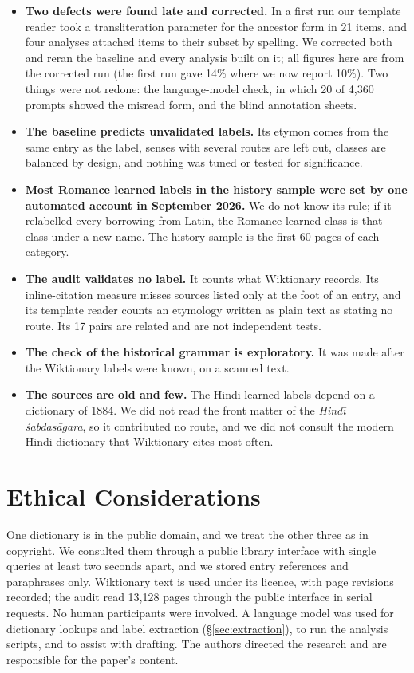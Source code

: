 \documentclass[11pt]{article}
\begin{document}
\begin{itemize}
\item \textbf{Two defects were found late and corrected.} In a first run our template reader took a transliteration parameter for the ancestor form in 21 items, and four analyses attached items to their subset by spelling. We corrected both and reran the baseline and every analysis built on it; all figures here are from the corrected run (the first run gave 14\% where we now report 10\%). Two things were not redone: the language-model check, in which 20 of 4,360 prompts showed the misread form, and the blind annotation sheets.
\item \textbf{The baseline predicts unvalidated labels.} Its etymon comes from the same entry as the label, senses with several routes are left out, classes are balanced by design, and nothing was tuned or tested for significance.
\item \textbf{Most Romance learned labels in the history sample were set by one automated account in September 2026.} We do not know its rule; if it relabelled every borrowing from Latin, the Romance learned class is that class under a new name. The history sample is the first 60 pages of each category.
\item \textbf{The audit validates no label.} It counts what Wiktionary records. Its inline-citation measure misses sources listed only at the foot of an entry, and its template reader counts an etymology written as plain text as stating no route. Its 17 pairs are related and are not independent tests.
\item \textbf{The check of the historical grammar is exploratory.} It was made after the Wiktionary labels were known, on a scanned text.
\item \textbf{The sources are old and few.} The Hindi learned labels depend on a dictionary of 1884. We did not read the front matter of the \textit{Hind\=\i{} \'sabdas\=agara}, so it contributed no route, and we did not consult the modern Hindi dictionary that Wiktionary cites most often.
\end{itemize}

\section*{Ethical Considerations}

One dictionary is in the public domain, and we treat the other three as in copyright. We consulted them through a public library interface with single queries at least two seconds apart, and we stored entry references and paraphrases only. Wiktionary text is used under its licence, with page revisions recorded; the audit read 13,128 pages through the public interface in serial requests. No human participants were involved. A language model was used for dictionary lookups and label extraction (\S\ref{sec:extraction}), to run the analysis scripts, and to assist with drafting. The authors directed the research and are responsible for the paper's content.
\end{document}

